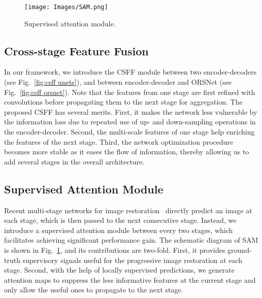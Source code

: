 \documentclass[10pt,twocolumn,letterpaper]{article}
\begin{document}
\begin{figure}[t]
\begin{center}
 \texttt{[image: Images/SAM.png]}  
\end{center}\vspace{-1.4em}
    \caption{ \small Supervised attention module.}
    \vspace{-0.5em}
    \label{fig:sam}
\vspace{-1.4em}
\end{figure}

\subsection{Cross-stage Feature Fusion}

In our framework, we introduce the CSFF module between two encoder-decoders (see Fig.~\ref{fig:csff unets}), and between encoder-decoder and ORSNet (see Fig.~\ref{fig:csff orsnet}).
Note that the features from one stage are first refined with  convolutions before propagating them to the next stage for aggregation. 
The proposed CSFF has several merits. 
First, it makes the network less vulnerable by the information loss due to repeated use of up- and down-sampling operations in the encoder-decoder. 
Second, the multi-scale features of one stage help enriching the features of the next stage. 
Third, the network optimization procedure becomes more stable as it eases the flow of information, thereby allowing us to add several stages in the overall architecture. 





\subsection{Supervised Attention Module}
Recent multi-stage networks for image restoration~\cite{Maitreya2020,dmphn2019} directly predict an image at each stage, which is then passed to the next consecutive stage.
Instead, we introduce a supervised attention module between every two stages, which facilitates achieving significant performance gain.
The schematic diagram of SAM is shown in Fig.~\ref{fig:sam}, and its contributions are two-fold. 
First, it provides ground-truth supervisory signals useful for the progressive image restoration at each stage. 
Second, with the help of locally supervised predictions, we generate attention maps to suppress the less informative features at the current stage and only allow the useful ones to propagate to the next stage.    
\end{document}
